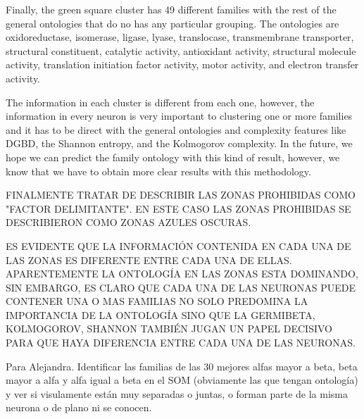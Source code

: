 \documentclass[preprint,12pt]{elsarticle}
\begin{document}
Finally, the green square cluster has 49 different families with 
the rest of the general ontologies that do no has any particular 
grouping. The ontologies are oxidoreductase, isomerase, ligase, 
lyase, translocase, transmembrane transporter, structural constituent, 
catalytic activity, antioxidant activity, structural molecule 
activity, translation initiation factor activity, motor activity, 
and electron transfer activity. \par 

The information in each cluster is different from each one, 
however, the information in every neuron is very important to 
clustering one or more families and it has to be direct with 
the general ontologies and complexity features like DGBD, 
the Shannon entropy, and the Kolmogorov complexity. In the 
future, we hope we can predict the family ontology with this 
kind of result, however, we know that we have to obtain more 
clear results with this methodology.  


\bigbreak
\par FINALMENTE TRATAR DE DESCRIBIR LAS ZONAS PROHIBIDAS COMO "FACTOR DELIMITANTE". EN ESTE CASO LAS ZONAS PROHIBIDAS SE DESCRIBIERON COMO ZONAS AZULES OSCURAS. \par 

ES EVIDENTE QUE LA INFORMACIÓN CONTENIDA EN CADA UNA DE LAS ZONAS ES DIFERENTE ENTRE CADA UNA DE ELLAS. APARENTEMENTE LA ONTOLOGÍA EN LAS ZONAS ESTA DOMINANDO, SIN EMBARGO, ES CLARO QUE CADA UNA DE LAS NEURONAS PUEDE CONTENER UNA O MAS FAMILIAS NO SOLO PREDOMINA LA IMPORTANCIA DE LA ONTOLOGÍA SINO QUE LA GERMIBETA, KOLMOGOROV, SHANNON TAMBIÉN JUGAN UN PAPEL DECISIVO PARA QUE HAYA DIFERENCIA ENTRE CADA UNA DE LAS NEURONAS. \par 

Para Alejandra. Identificar las familias de las 30 mejores alfas mayor a beta, beta mayor a alfa y alfa igual a beta en el SOM  (obviamente las que tengan ontología) y ver si visulamente están muy separadas o juntas, o forman parte de la misma neurona o de plano ni se conocen. \par


\clearpage
\end{document}
